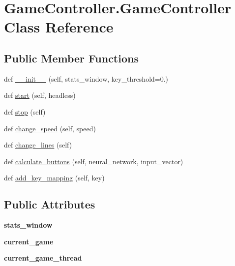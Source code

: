 \hypertarget{classGameController_1_1GameController}{}\section{Game\+Controller.\+Game\+Controller Class Reference}
\label{classGameController_1_1GameController}
\subsection*{Public Member Functions}
\begin{DoxyCompactItemize}
\item 
def \hyperlink{classGameController_1_1GameController_a8e0ebfe57e0c1850047d4f271e296187}{\+\_\+\+\_\+init\+\_\+\+\_\+} (self, stats\+\_\+window, key\+\_\+threshold=0.)
\item 
def \hyperlink{classGameController_1_1GameController_a000e1b43edbc5454673763a491f53d27}{start} (self, headless)
\item 
def \hyperlink{classGameController_1_1GameController_adceb4b825410df4ac33c63732c5ebb1c}{stop} (self)
\item 
def \hyperlink{classGameController_1_1GameController_a6e9c793d9f9c7f91ef86fdfbad1f399c}{change\+\_\+speed} (self, speed)
\item 
def \hyperlink{classGameController_1_1GameController_a6df31616562721415f855506ac39200e}{change\+\_\+lines} (self)
\item 
def \hyperlink{classGameController_1_1GameController_adfa21a1d6a41248487a720c5311eb5c7}{calculate\+\_\+buttons} (self, neural\+\_\+network, input\+\_\+vector)
\item 
def \hyperlink{classGameController_1_1GameController_a7828e77aa375bd536fe94f502cf177e5}{add\+\_\+key\+\_\+mapping} (self, key)
\end{DoxyCompactItemize}
\subsection*{Public Attributes}
\begin{DoxyCompactItemize}
\item 
{\bfseries stats\+\_\+window}\hypertarget{classGameController_1_1GameController_a2a1ba0465b97db6b05716e321f778a8d}{}\label{classGameController_1_1GameController_a2a1ba0465b97db6b05716e321f778a8d}

\item 
{\bfseries current\+\_\+game}\hypertarget{classGameController_1_1GameController_aa9126bcbf2b35e3f5216409e8e27451f}{}\label{classGameController_1_1GameController_aa9126bcbf2b35e3f5216409e8e27451f}

\item 
{\bfseries current\+\_\+game\+\_\+thread}\hypertarget{classGameController_1_1GameController_acf065316475a9b63dcd44ddb367acf45}{}\label{classGameController_1_1GameController_acf065316475a9b63dcd44ddb367acf45}

\end{DoxyCompactItemize}


